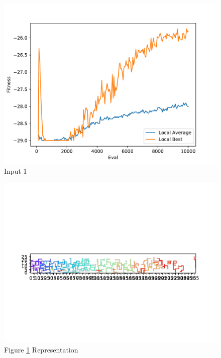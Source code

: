 \documentclass{standalone}
\begin{document}
\begin{figure}[!htb]
	\caption{Input 1}
	\label{fig:graph_1017}
	\includegraphics[width=\textwidth]{../graphs/graphs/1017.pdf}
\end{figure}


\begin{figure}[!htb]
	\caption{Figure \ref{fig:graph_1017} Representation}
	\label{fig:picture_1017}
	\includegraphics[width=\textwidth]{../graphs/picture/1017.pdf}
\end{figure}
\end{document}
